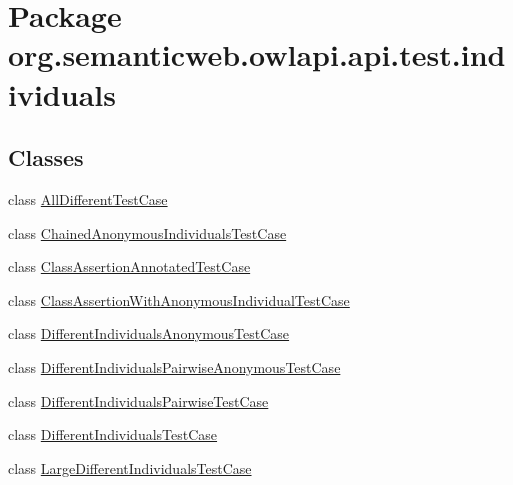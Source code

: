 \hypertarget{namespaceorg_1_1semanticweb_1_1owlapi_1_1api_1_1test_1_1individuals}{\section{Package org.\-semanticweb.\-owlapi.\-api.\-test.\-individuals}
\label{namespaceorg_1_1semanticweb_1_1owlapi_1_1api_1_1test_1_1individuals}
}
\subsection*{Classes}
\begin{DoxyCompactItemize}
\item 
class \hyperlink{classorg_1_1semanticweb_1_1owlapi_1_1api_1_1test_1_1individuals_1_1_all_different_test_case}{All\-Different\-Test\-Case}
\item 
class \hyperlink{classorg_1_1semanticweb_1_1owlapi_1_1api_1_1test_1_1individuals_1_1_chained_anonymous_individuals_test_case}{Chained\-Anonymous\-Individuals\-Test\-Case}
\item 
class \hyperlink{classorg_1_1semanticweb_1_1owlapi_1_1api_1_1test_1_1individuals_1_1_class_assertion_annotated_test_case}{Class\-Assertion\-Annotated\-Test\-Case}
\item 
class \hyperlink{classorg_1_1semanticweb_1_1owlapi_1_1api_1_1test_1_1individuals_1_1_class_assertion_with_anonymous_individual_test_case}{Class\-Assertion\-With\-Anonymous\-Individual\-Test\-Case}
\item 
class \hyperlink{classorg_1_1semanticweb_1_1owlapi_1_1api_1_1test_1_1individuals_1_1_different_individuals_anonymous_test_case}{Different\-Individuals\-Anonymous\-Test\-Case}
\item 
class \hyperlink{classorg_1_1semanticweb_1_1owlapi_1_1api_1_1test_1_1individuals_1_1_different_individuals_pairwise_anonymous_test_case}{Different\-Individuals\-Pairwise\-Anonymous\-Test\-Case}
\item 
class \hyperlink{classorg_1_1semanticweb_1_1owlapi_1_1api_1_1test_1_1individuals_1_1_different_individuals_pairwise_test_case}{Different\-Individuals\-Pairwise\-Test\-Case}
\item 
class \hyperlink{classorg_1_1semanticweb_1_1owlapi_1_1api_1_1test_1_1individuals_1_1_different_individuals_test_case}{Different\-Individuals\-Test\-Case}
\item 
class \hyperlink{classorg_1_1semanticweb_1_1owlapi_1_1api_1_1test_1_1individuals_1_1_large_different_individuals_test_case}{Large\-Different\-Individuals\-Test\-Case}

\end{DoxyCompactItemize}
